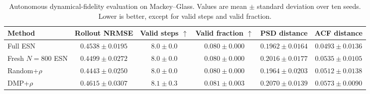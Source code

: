 \begin{table}[t]
\centering
\caption{
Autonomous dynamical-fidelity evaluation on Mackey--Glass. Values are
mean $\pm$ standard deviation over ten seeds. Lower is better, except for
valid steps and valid fraction.
}
\label{tab:dynamical_fidelity}
\small
\setlength{\tabcolsep}{5pt}
\renewcommand{\arraystretch}{1.12}
\begin{tabular}{lccccc}
\toprule
\textbf{Method}
& \textbf{Rollout NRMSE}
& \textbf{Valid steps $\uparrow$}
& \textbf{Valid fraction $\uparrow$}
& \textbf{PSD distance}
& \textbf{ACF distance} \\
\midrule
Full ESN
& $0.4538 \pm 0.0195$
& $8.0 \pm 0.0$
& $0.080 \pm 0.000$
& $\mathbf{0.1962 \pm 0.0164}$
& $\mathbf{0.0493 \pm 0.0136}$ \\

Fresh $N=800$ ESN
& $0.4499 \pm 0.0272$
& $8.0 \pm 0.0$
& $0.080 \pm 0.000$
& $0.2016 \pm 0.0177$
& $0.0535 \pm 0.0105$ \\

Random+$\rho$
& $\mathbf{0.4443 \pm 0.0250}$
& $8.0 \pm 0.0$
& $0.080 \pm 0.000$
& $0.1964 \pm 0.0203$
& $0.0512 \pm 0.0138$ \\

DMP+$\rho$
& $0.4615 \pm 0.0307$
& $\mathbf{8.1 \pm 0.3}$
& $\mathbf{0.081 \pm 0.003}$
& $0.2070 \pm 0.0139$
& $0.0573 \pm 0.0090$ \\
\bottomrule
\end{tabular}
\end{table}
